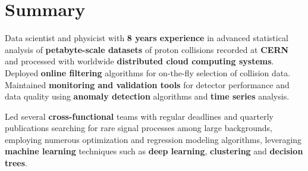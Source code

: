 \documentclass{myfancycv}
\begin{document}
\makeheader
\vspace*{-.35em}

  \vspace*{-0.5em}
\section{Summary}

Data scientist and physicist with {\bf 8 years experience} in advanced statistical analysis of {\bf petabyte-scale datasets} of proton collisions recorded at {\bf CERN} and processed with worldwide {\bf distributed cloud computing systems}. Deployed {\bf online filtering} algorithms for on-the-fly selection of collision data. Maintained {\bf monitoring and validation tools} for detector performance and data quality using {\bf anomaly detection} algorithms and {\bf time series} analysis.

Led several {\bf cross-functional} teams with regular deadlines and quarterly publications searching for rare signal processes among large backgrounds, employing numerous optimization and regression modeling algorithms, leveraging {\bf machine learning} techniques such
as {\bf deep learning}, {\bf clustering} and {\bf decision trees}.



\end{document}
